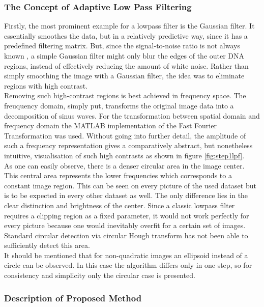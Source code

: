 \documentclass{article}
\begin{document}
\subsubsection{The Concept of Adaptive Low Pass Filtering} \label{sec: Adaptive Lowpass Filter}
Firstly, the most prominent example for a lowpass filter is the Gaussian filter. It essentially smoothes the data, but in a relatively predictive way, since it has a predefined filtering matrix. But, since the signal-to-noise ratio is not always known , a simple Gaussian filter might only blur the edges of the outer DNA regions, instead of effectively reducing the amount of white noise. Rather than simply smoothing the image with a Gaussian filter, the idea was to eliminate regions with high contrast.  \\
Removing such high-contrast regions is best achieved in frequency space. The freuquency domain, simply put, transforms the original image data into a decomposition of sinus waves. For the transformation between spatial domain and frequency domain the MATLAB implementation of the Fast Fourier Transformation was used. Without going into further detail, the amplitude of such a frequency representation gives a comparatively abstract, but nonetheless intuitive, visualisation of such high contrasts as shown in figure \ref{fig:step1lpf}. \\
As one can easily observe, there is a denser circular area in the image center. This central area represents the lower frequencies which corresponds to a constant image region. This can be seen on every picture of the used dataset but is to be expected in every other dataset as well. The only difference lies in the clear distinction and brightness of the center. Since a classic lowpass filter requires a clipping region as a fixed parameter, it would not work perfectly for every picture because one would inevitably overfit for a certain set of images. Standard circular detection via circular Hough transform has not been able to sufficiently detect this area. \\
It should be mentioned that for non-quadratic images an ellipsoid instead of a circle can be observed. In this case the algorithm differs only in one step, so for consistency and simplicity only the circular case is presented. \\

\subsubsection{Description of Proposed Method}
\end{document}
